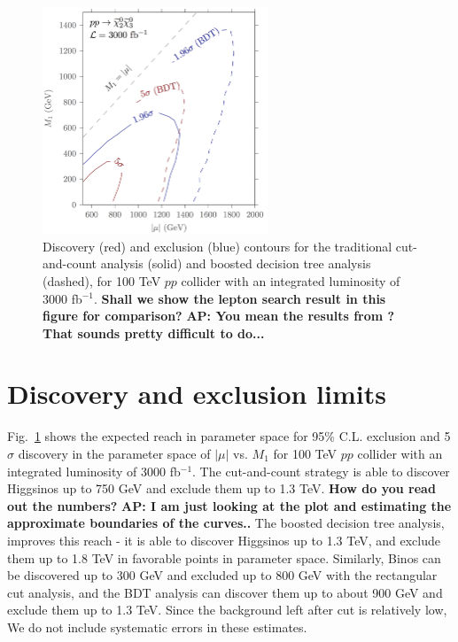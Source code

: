 \documentclass[a4paper,11pt]{article}
\newcommand{\Shufang}[1]{{\bf\color{Maroon}  #1}}
\newcommand{\Adarsh}[1]{{\bf\color{RoyalBlue} AP: #1}}
\begin{document}
\begin{figure}[h]
\centering
\includegraphics[width=0.6\textwidth]{images/dm_100_TeV_contours.png}

\caption{ Discovery (red) and exclusion (blue) contours for the traditional
  cut-and-count analysis (solid) and boosted decision tree analysis (dashed),
  for 100 TeV $pp$ collider with an integrated luminosity of 3000 fb$^{-1}$.
\Shufang{Shall we show the lepton search result in this figure for comparison?}
\Adarsh{You mean the results from \cite{Gori:2014oua}? That sounds pretty
difficult to do...}
}

\label{fig:contours}
\end{figure}

\section{Discovery and exclusion limits}
\label{sec:results}

Fig.~\ref{fig:contours} shows the expected reach in parameter space for 95\%
C.L. exclusion and 5$\sigma$ discovery in the parameter space of $|\mu|$ vs.
$M_1$ for 100 TeV $pp$ collider with an integrated luminosity of 3000
fb$^{-1}$. The cut-and-count strategy is able to discover Higgsinos up to 750
GeV  and exclude them up to 1.3 TeV. \Shufang{How do you read out the numbers?}
\Adarsh{I am just looking at the plot and estimating the approximate boundaries
of the curves..}  The boosted decision tree analysis, improves this reach - it
is able to discover Higgsinos up to 1.3 TeV, and exclude them up to 1.8 TeV in
favorable points in parameter space.  Similarly, Binos can be discovered up to
300 GeV and excluded up to 800 GeV with the rectangular cut analysis, and the
BDT analysis can discover them up to about 900 GeV and exclude them up to 1.3
TeV. Since the background left after cut is relatively low, We do not include
systematic errors in these estimates.  
\end{document}
